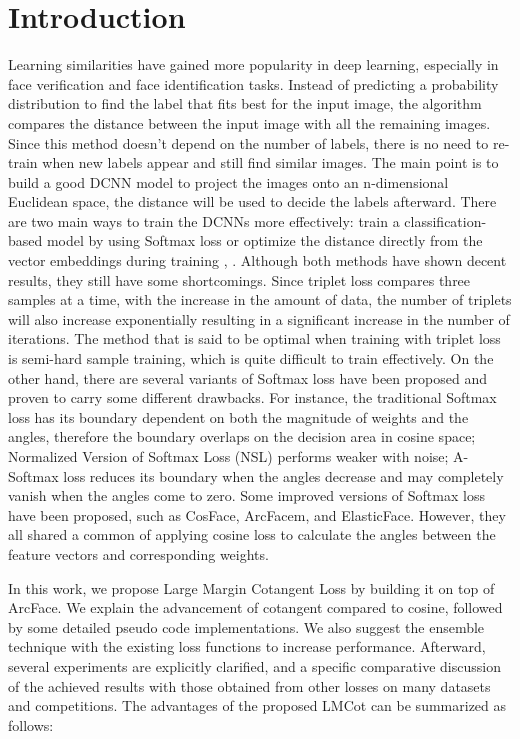 \section{Introduction}
Learning similarities have gained more popularity in deep learning, especially in face verification and face identification tasks. Instead of predicting a probability distribution to find the label that fits best for the input image, the algorithm compares the distance between the input image with all the remaining images. Since this method doesn't depend on the number of labels, there is no need to re-train when new labels appear and still find similar images. The main point is to build a good DCNN model to project the images onto an n-dimensional Euclidean space, the distance will be used to decide the labels afterward.
There are two main ways to train the DCNNs more effectively: train a classification-based model by using Softmax loss \cite{liu2017sphereface, wang2018support, wang2018cosface, deng2019arcface, zhang2019adacos, boutros2022elasticface} or optimize the distance directly from the vector embeddings during training \cite{dubey2018pairwise}, \cite{schroff2015facenet}. Although both methods have shown decent results, they still have some shortcomings. Since triplet loss compares three samples at a time, with the increase in the amount of data, the number of triplets will also increase exponentially resulting in a significant increase in the number of iterations. The method that is said to be optimal when training with triplet loss is semi-hard sample training, which is quite difficult to train effectively. On the other hand, there are several variants of Softmax loss have been proposed and proven to carry some different drawbacks. For instance, the traditional Softmax loss has its boundary dependent on both the magnitude of weights and the angles, therefore the boundary overlaps on the decision area in cosine space; Normalized Version of Softmax Loss (NSL) performs weaker with noise; A-Softmax \cite{liu2017sphereface} loss reduces its boundary when the angles decrease and may completely vanish when the angles come to zero. Some improved versions of Softmax loss have been proposed, such as CosFace, ArcFacem, and ElasticFace. However, they all shared a common of applying cosine loss to calculate the angles between the feature vectors and corresponding weights.

In this work, we propose Large Margin Cotangent Loss by building it on top of ArcFace. We explain the advancement of cotangent compared to cosine, followed by some detailed pseudo code implementations. We also suggest the ensemble technique with the existing loss functions to increase performance. Afterward, several experiments are explicitly clarified, and a specific comparative discussion of the achieved results with those obtained from other losses on many datasets and competitions. The advantages of the proposed LMCot can be summarized as follows:

